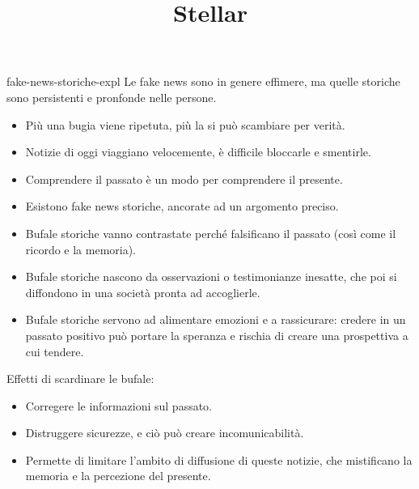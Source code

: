 \documentclass[preview]{standalone}
\begin{document}
\title{Stellar}
\genpage


\begin{snippet}{fake-news-storiche-expl}
    Le fake news sono in genere effimere, ma quelle storiche sono persistenti e
    pronfonde nelle persone.

    \begin{itemize}
        \item Più una bugia viene ripetuta, più la si può scambiare per verità.
        \item Notizie di oggi viaggiano velocemente, è difficile bloccarle e smentirle.
        \item Comprendere il passato è un modo per comprendere il presente.
        \item Esistono fake news storiche, ancorate ad un argomento preciso.
        \item Bufale storiche vanno contrastate perché falsificano il passato (così come il ricordo e la memoria).
        \item Bufale storiche nascono da osservazioni o testimonianze inesatte, che poi si diffondono in una società pronta ad accoglierle.
        \item Bufale storiche servono ad alimentare emozioni e a rassicurare: credere in un passato positivo può portare la speranza e rischia di creare una prospettiva a cui tendere.
    \end{itemize}

    Effetti di scardinare le bufale:

    \begin{itemize}
        \item Corregere le informazioni sul passato.
        \item Distruggere sicurezze, e ciò può creare incomunicabilità.
        \item Permette di limitare l'ambito di diffusione di queste notizie, che mistificano la memoria e la percezione del presente.
    \end{itemize}
\end{snippet}
\end{document}
